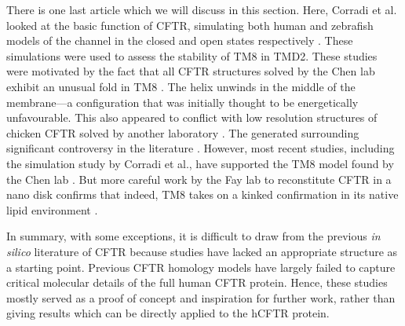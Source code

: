 
There is one last article which we will discuss in this section. Here, Corradi et al. looked at the basic function of CFTR, simulating both human and zebrafish models of the channel in the closed and open states respectively \cite{corradi2018}. These simulations were used to assess the stability of TM8 in TMD2. These studies were motivated by the fact that all CFTR structures solved by the Chen lab exhibit an unusual fold in TM8 \cite{fiedorczuk2021, liu2017, liu2019, zhang2016, zhang2018a, zhang2017a}. The helix unwinds in the middle of the membrane---a configuration that was initially thought to be energetically unfavourable. This also appeared to conflict with low resolution structures of chicken CFTR solved by another laboratory \cite{fay2018}. The generated surrounding significant controversy in the literature \cite{negoda2019, hegedus2022, infield2021, thomas2020}. However, most recent studies, including the simulation study by Corradi et al., have supported the TM8 model found by the Chen lab \cite{corradi2018, negoda2019}. But more careful work by the Fay lab to reconstitute CFTR in a nano disk confirms that indeed, TM8 takes on a kinked confirmation in its native lipid environment \cite{aleksandrov2022}.

In summary, with some exceptions, it is difficult to draw from the previous \textit{in silico} literature of CFTR because studies have lacked an appropriate structure as a starting point. Previous CFTR homology models have largely failed to capture critical molecular details of the full human CFTR protein. Hence, these studies mostly served as a proof of concept and inspiration for further work, rather than giving results which can be directly applied to the hCFTR protein. 


